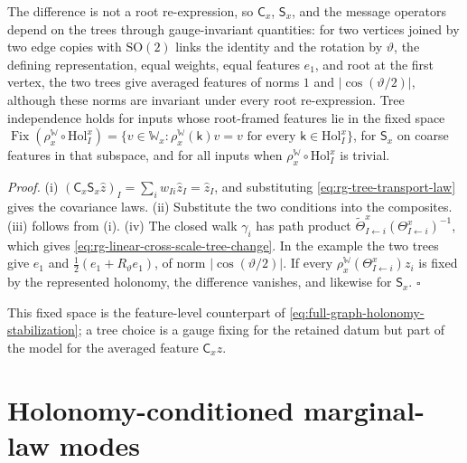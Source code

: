 The difference is not a root re-expression, so $\mathsf C_x$, $\mathsf S_x$, and the message operators
depend on the trees through gauge-invariant quantities: for two vertices joined by two edge copies with
$\mathrm{SO}(2)$ links the identity and the rotation by $\vartheta$, the defining representation, equal
weights, equal features $e_1$, and root at the first vertex, the two trees give averaged features of norms
$1$ and $\lvert\cos(\vartheta/2)\rvert$, although these norms are invariant under every root
re-expression. Tree independence holds for inputs whose root-framed features lie in the fixed space
$\operatorname{Fix}(\rho^{\mathbb W}_x\circ\mathrm{Hol}^x_I)=\{v\in \mathbb W_x:\rho^{\mathbb W}_x(\mathsf k)v=v\text{ for every }\mathsf k\in\mathrm{Hol}^x_I\}$,
for $\mathsf S_x$ on coarse features in that subspace, and for all inputs when
$\rho^{\mathbb W}_x\circ\mathrm{Hol}^x_I$ is trivial. 

\noindent\emph{Proof.}
(i) $(\mathsf C_x\mathsf S_x\hat z)_I=\sum_iw_{Ii}\hat z_I=\hat z_I$, and substituting
\eqref{eq:rg-tree-transport-law} gives the covariance laws. (ii) Substitute the two conditions into the
composites. (iii) follows from (i). (iv) The closed walk $\gamma_i$ has path product
$\widetilde\Theta^x_{I\leftarrow i}(\Theta^x_{I\leftarrow i})^{-1}$, which gives
\eqref{eq:rg-linear-cross-scale-tree-change}. In the example the two trees give $e_1$ and
$\tfrac12(e_1+R_\vartheta e_1)$, of norm $\lvert\cos(\vartheta/2)\rvert$. If every
$\rho^{\mathbb W}_x(\Theta^x_{I\leftarrow i})z_i$ is fixed by the represented holonomy, the difference vanishes, and
likewise for $\mathsf S_x$. $\square$

This fixed space is the feature-level counterpart of \eqref{eq:full-graph-holonomy-stabilization}; a tree
choice is a gauge fixing for the retained datum but part of the model for the averaged feature
$\mathsf C_xz$.

\section{Holonomy-conditioned marginal-law modes}
\label{sec:cg-holonomy-law-modes}

